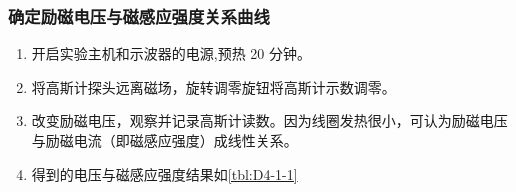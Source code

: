 \documentclass[dvipsnames, svgnames,a4paper,11pt]{article}
\begin{document}
	\subsubsection{确定励磁电压与磁感应强度关系曲线}

		\begin{enumerate}
			\item 开启实验主机和示波器的电源,预热 20 分钟。
			\item 将高斯计探头远离磁场，旋转调零旋钮将高斯计示数调零。
			\item 改变励磁电压，观察并记录高斯计读数。因为线圈发热很小，可认为励磁电压与励磁电流（即磁感应强度）成线性关系。
			\item 得到的电压与磁感应强度结果如\cref{tbl:D4-1-1}
		\end{enumerate}


		\begin{table}[ht]
			\centering
			\caption{励磁电压与磁感应强度关系}
			\label{tbl:D4-1-1}
		\end{table}
\end{document}
